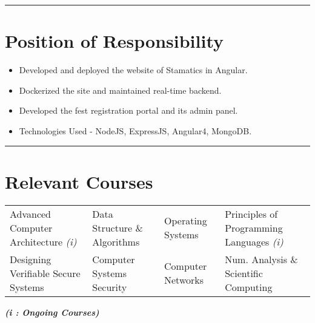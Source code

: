 \documentclass[10pt, margin=0.5in]{deedy-resume-openfont}
\begin{document}
\begin{minipage}[t]{0.48\textwidth}
\vspace{2pt}				%
\rule{\textwidth}{0.5pt}	%
\vspace{-16pt}				%

\section{Position of Responsibility}
\begin{itemize}[leftmargin=*, noitemsep]
  \item Developed and deployed the website of Stamatics in Angular.
  \item Dockerized the site and maintained real-time backend.	
\end{itemize}	
\begin{itemize}[leftmargin=*, noitemsep]
  \item Developed the fest registration portal and its admin panel.
  \item Technologies Used - NodeJS, ExpressJS, Angular4, MongoDB.	
\end{itemize}

\end{minipage}

\vspace{2pt}				%
\rule{\textwidth}{0.5pt}	%
\vspace{-18pt}				%

\section{\hspace{0.5cm}Relevant Courses}
\hspace{-6pt} \begin{tabular*}{\textwidth}{llll}
Advanced Computer Architecture \textit{(i)} & Data Structure \& Algorithms & Operating Systems & Principles of Programming Languages \textit{(i)} \\
Designing Verifiable Secure Systems & Computer Systems Security & Computer Networks & Num. Analysis \& Scientific Computing
\end{tabular*}


\hspace{-2pt} {\footnotesize \textit{\textbf{ (i : Ongoing Courses)}}}
\end{document}
